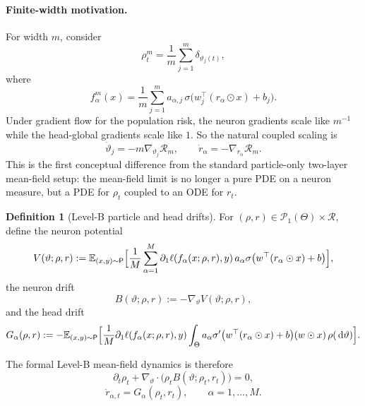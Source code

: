 \documentclass[11pt]{article}
\theoremstyle{definition}
\newtheorem{definition}[theorem]{Definition}
\newcommand{\E}{\mathbb{E}}
\newcommand{\PP}{\mathcal{P}}
\newcommand{\dd}{\,\mathrm{d}}
\begin{document}
\paragraph{Finite-width motivation.}
For width $m$, consider
\[
  \rho_t^m=\frac1m\sum_{j=1}^m \delta_{\vartheta_j(t)},
\]
where
\[
  f_{\alpha}^{m}(x)
  =
  \frac1m\sum_{j=1}^m
  a_{\alpha,j}\,\sigma\bigl(w_j^\top (r_\alpha\odot x)+b_j\bigr).
\]
Under gradient flow for the population risk, the neuron gradients scale like $m^{-1}$ while the head-global gradients scale like $1$.
So the natural coupled scaling is
\begin{equation}
  \dot \vartheta_j = -m \nabla_{\vartheta_j}\mathcal R_m,
  \qquad
  \dot r_\alpha = - \nabla_{r_\alpha}\mathcal R_m.
  \label{eq:levelb-scaling}
\end{equation}
This is the first conceptual difference from the standard particle-only two-layer mean-field setup:
the mean-field limit is no longer a pure PDE on a neuron measure, but a PDE for $\rho_t$ coupled to an ODE for $r_t$.

\begin{definition}[Level-B particle and head drifts]
For $(\rho,r)\in \PP_1(\Theta)\times \mathcal R$, define the neuron potential
\begin{equation}
  V(\vartheta;\rho,r)
  :=
  \E_{(x,y)\sim\mathsf P}
  \Bigl[
    \frac1M\sum_{\alpha=1}^M
    \partial_1\ell(f_\alpha(x;\rho,r),y)\,
    a_\alpha \sigma\bigl(w^\top(r_\alpha\odot x)+b\bigr)
  \Bigr],
  \label{eq:levelb-potential}
\end{equation}
the neuron drift
\begin{equation}
  B(\vartheta;\rho,r):=-\nabla_\vartheta V(\vartheta;\rho,r),
  \label{eq:levelb-neuron-drift}
\end{equation}
and the head drift
\begin{equation}
  G_\alpha(\rho,r)
  :=
  -\E_{(x,y)\sim\mathsf P}
  \Bigl[
    \frac1M
    \partial_1\ell(f_\alpha(x;\rho,r),y)
    \int_\Theta
    a_\alpha \sigma'\bigl(w^\top(r_\alpha\odot x)+b\bigr)
    (w\odot x)
    \,\rho(\dd \vartheta)
  \Bigr].
  \label{eq:levelb-head-drift}
\end{equation}
\end{definition}

The formal Level-B mean-field dynamics is therefore
\begin{equation}
  \partial_t \rho_t
  +
  \nabla_\vartheta\cdot\bigl(\rho_t B(\vartheta;\rho_t,r_t)\bigr)
  =
  0,
  \label{eq:levelb-pde}
\end{equation}
\begin{equation}
  \dot r_{\alpha,t}=G_\alpha(\rho_t,r_t),
  \qquad
  \alpha=1,\dots,M.
  \label{eq:levelb-ode}
\end{equation}
\end{document}
